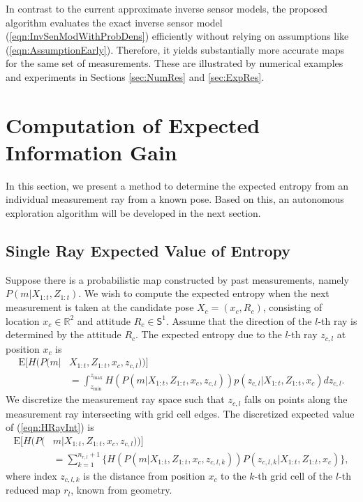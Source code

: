 \documentclass[smallextended]{svjour3}       %
\newcommand{\refeqn}[1]{(\ref{eqn:#1})}
\renewcommand{\Re}{\ensuremath{\mathbb{R}}}
\newcommand{\Sph}{\ensuremath{\mathsf{S}}}
\begin{document}
In contrast to the current approximate inverse sensor models, the proposed algorithm evaluates the exact inverse sensor model \refeqn{InvSenModWithProbDens} efficiently without relying on assumptions like \refeqn{AssumptionEarly}. Therefore, it yields substantially more accurate maps for the same set of measurements. These are illustrated by numerical examples and experiments in Sections \ref{sec:NumRes} and \ref{sec:ExpRes}.



\section{Computation of Expected Information Gain}
\label{sec:ExpectedInfoGain}

In this section, we present a method to determine the expected entropy from an individual measurement ray from a known pose. Based on this, an autonomous exploration algorithm will be developed in the next section.


\subsection{Single Ray Expected Value of Entropy}
Suppose there is a probabilistic map constructed by past measurements, namely \\$P(m|X_{1:t},Z_{1:t})$. We wish to compute the expected entropy when the next measurement is taken at the candidate pose $X_c=(x_c,R_c)$, consisting of location $x_c\in\Re^2$ and attitude $R_c\in\Sph^1$. Assume that the direction of the $l$-th ray is determined by the attitude $R_c$.
The expected entropy due to the $l$-th ray $z_{c,l}$ at position $x_c$ is
\begin{align}
\label{eqn:HRayInt}
\text{E}[H(P(m|&X_{1:t},Z_{1:t},x_c,z_{c,l}))]
\nonumber\\&
=\int_{z_\text{min}}^{z_\text{max}}
H(P(m|X_{1:t},Z_{1:t},x_c,z_{c,l}))%
p(z_{c,l}|X_{1:t},Z_{1:t},x_c)
dz_{c,l}.
\end{align}
We discretize the measurement ray space such that $z_{c,l}$ falls on points along the measurement ray intersecting with grid cell edges. %
The discretized expected value of \refeqn{HRayInt} is
\begin{align}
\label{eqn:DiscExpEntropyRay}
\text{E}[H(P(&m|X_{1:t},Z_{1:t},x_c,z_{c,l}))]
\nonumber\\&=\sum_{k=1}^{n_{r,l}+1}\bigg\{H(P(m|X_{1:t},Z_{1:t},x_c,z_{c,l,k}))%
P(z_{c,l,k}|X_{1:t},Z_{1:t},x_c)\bigg\},
\end{align}
where index $z_{c,l,k}$ is the distance from position $x_c$ to the $k$-th grid cell of the $l$-th reduced map $r_l$, known from geometry.
\end{document}
